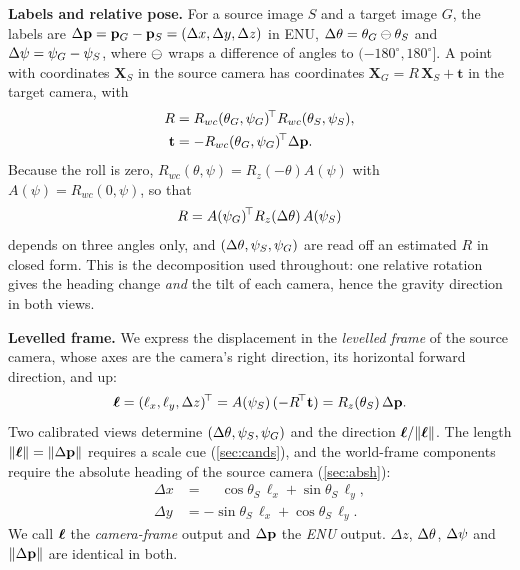 \noindent\textbf{Labels and relative pose.} For a source image $S$ and a target image $G$, the labels are $\Delta\mathbf{p}=\mathbf{p}_G-\mathbf{p}_S=(\Delta x,\Delta y,\Delta z)$ in ENU, $\Delta\theta=\theta_G\ominus\theta_S$ and $\Delta\psi=\psi_G-\psi_S$, where $\ominus$ wraps a difference of angles to $(-180^\circ,180^\circ]$. A point with coordinates $\mathbf{X}_S$ in the source camera has coordinates $\mathbf{X}_G=R\,\mathbf{X}_S+\mathbf{t}$ in the target camera, with
\begin{equation}
\begin{aligned}
R&=R_{wc}(\theta_G,\psi_G)^{\!\top}R_{wc}(\theta_S,\psi_S),\\
\mathbf{t}&=-R_{wc}(\theta_G,\psi_G)^{\!\top}\Delta\mathbf{p} .
\end{aligned}
\end{equation}
Because the roll is zero, $R_{wc}(\theta,\psi)=R_z(-\theta)A(\psi)$ with $A(\psi)=R_{wc}(0,\psi)$, so that
\begin{equation}
R=A(\psi_G)^{\!\top}R_z(\Delta\theta)\,A(\psi_S)
\label{eq:rdecomp}
\end{equation}
depends on three angles only, and $(\Delta\theta,\psi_S,\psi_G)$ are read off an estimated $R$ in closed form. This is the decomposition used throughout: one relative rotation gives the heading change \emph{and} the tilt of each camera, hence the gravity direction in both views.

\noindent\textbf{Levelled frame.} We express the displacement in the \emph{levelled frame} of the source camera, whose axes are the camera's right direction, its horizontal forward direction, and up:
\begin{equation}
\bm{\ell}=(\ell_x,\ell_y,\Delta z)^{\!\top}=A(\psi_S)\,(-R^{\!\top}\mathbf{t})=R_z(\theta_S)\,\Delta\mathbf{p} .
\label{eq:level}
\end{equation}
Two calibrated views determine $(\Delta\theta,\psi_S,\psi_G)$ and the direction $\bm{\ell}/\|\bm{\ell}\|$. The length $\|\bm{\ell}\|=\|\Delta\mathbf{p}\|$ requires a scale cue (\cref{sec:cands}), and the world-frame components require the absolute heading of the source camera (\cref{sec:absh}):
\begin{equation}
\begin{aligned}
\Delta x&=\phantom{-}\cos\theta_S\,\ell_x+\sin\theta_S\,\ell_y,\\
\Delta y&=-\sin\theta_S\,\ell_x+\cos\theta_S\,\ell_y .
\end{aligned}
\label{eq:world}
\end{equation}
We call $\bm{\ell}$ the \emph{camera-frame} output and $\Delta\mathbf{p}$ the \emph{ENU} output. $\Delta z$, $\Delta\theta$, $\Delta\psi$ and $\|\Delta\mathbf{p}\|$ are identical in both.

